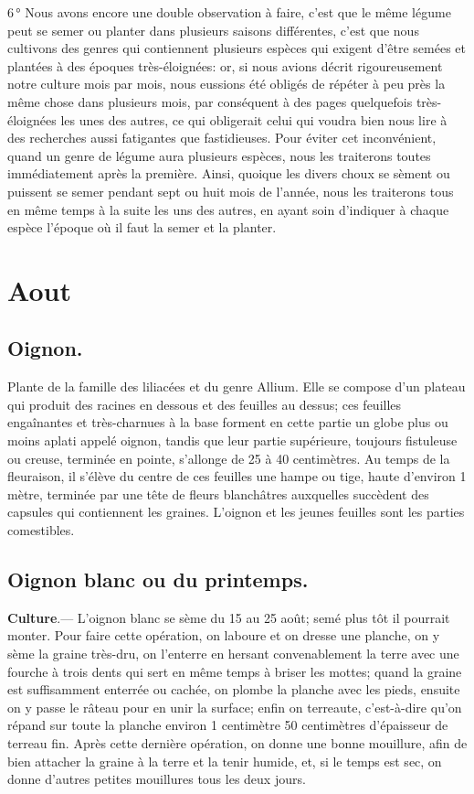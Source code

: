 \documentclass[10pt,a4paper]{book}
\begin{document}
6\,° Nous avons encore une double observation à faire, c'est que le même légume peut se semer ou planter dans plusieurs saisons différentes, c'est que nous cultivons des genres qui contiennent plusieurs espèces qui exigent d'être semées et plantées à des époques très-éloignées: or, si nous avions décrit rigoureusement notre culture mois par mois, nous eussions été obligés de répéter à peu près la même chose dans plusieurs mois, par conséquent à des pages quelquefois très-éloignées les unes des autres, ce qui obligerait celui qui voudra bien nous lire à des recherches aussi fatigantes que fastidieuses. Pour éviter cet inconvénient, quand un genre de légume aura plusieurs espèces, nous les traiterons toutes immédiatement après la première. Ainsi, quoique les divers choux se sèment ou puissent se semer pendant sept ou huit mois de l'année, nous les traiterons tous en même temps à la suite les uns des autres, en ayant soin d'indiquer à chaque espèce l'époque où il faut la semer et la planter.

\section{Aout}

\subsection{Oignon.}

Plante de la famille des liliacées et du genre Allium. Elle se compose d'un plateau qui produit des racines en dessous et des feuilles au dessus; ces feuilles engaînantes et très-charnues à la base forment en cette partie un globe plus ou moins aplati appelé oignon, tandis que leur partie supérieure, toujours fistuleuse ou creuse, terminée en pointe, s'allonge de 25 à 40 centimètres. Au temps de la fleuraison, il s'élève du centre de ces feuilles une hampe ou tige, haute d'environ 1 mètre, terminée par une tête de fleurs blanchâtres auxquelles succèdent des capsules qui contiennent les graines. L'oignon et les jeunes feuilles sont les parties comestibles.

\subsection{Oignon blanc ou du printemps.}\label{oignonblanc} 

\textbf{Culture}.--- L'oignon blanc se sème du 15 au 25 août; semé plus tôt il pourrait monter. Pour faire cette opération, on laboure et on dresse une planche, on y sème la graine très-dru, on l'enterre en hersant convenablement la terre avec une fourche à trois dents qui sert en même temps à briser les mottes; quand la graine est suffisamment enterrée ou cachée, on plombe la planche avec les pieds, ensuite on y passe le râteau pour en unir la surface; enfin on terreaute, c'est-à-dire qu'on répand sur toute la planche environ 1 centimètre 50 centimètres d'épaisseur de terreau fin. Après cette dernière opération, on donne une bonne mouillure, afin de bien attacher la graine à la terre et la tenir humide, et, si le temps est sec, on donne d'autres petites mouillures tous les deux jours.
\end{document}
